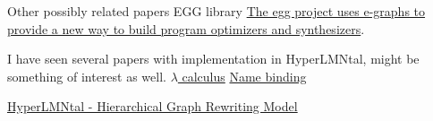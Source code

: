 \documentclass{article}
\theoremstyle{plain}
\theoremstyle{definition}
\begin{document}
\begin{section}{Other possibly related papers}
EGG library \href{https://pavpanchekha.com/blog/egg-bindings.html}{The egg project uses e-graphs to provide a new way to build program optimizers and synthesizers}.

I have seen several papers with implementation in HyperLMNtal, might be something of interest as well. 
\href{https://ieeexplore.ieee.org/stamp/stamp.jsp?tp=&arnumber=7541894}{$\lambda$ calculus}
\href{https://www.jstage.jst.go.jp/article/transinf/E101.D/4/E101.D_2017EDP7257/_pdf/-char/en}{Name binding} 

\href{https://link.springer.com/article/10.1007/s13218-011-0162-3}{HyperLMNtal - Hierarchical Graph Rewriting Model}
    
\end{section}


\end{document}
